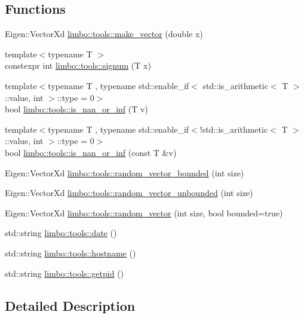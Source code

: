 \subsection*{Functions}
\begin{DoxyCompactItemize}
\item 
Eigen\+::\+Vector\+Xd \hyperlink{group__tools_ga029807776f0b7f44f806e4f9d92e34e7}{limbo\+::tools\+::make\+\_\+vector} (double x)
\item 
{\footnotesize template$<$typename T $>$ }\\constexpr int \hyperlink{group__tools_ga156cca8d927600da93054c952247857b}{limbo\+::tools\+::signum} (T x)
\item 
{\footnotesize template$<$typename T , typename std\+::enable\+\_\+if$<$ std\+::is\+\_\+arithmetic$<$ T $>$\+::value, int $>$\+::type  = 0$>$ }\\bool \hyperlink{group__tools_gabcb0caa2ffabd42fa865c9ab0b624681}{limbo\+::tools\+::is\+\_\+nan\+\_\+or\+\_\+inf} (T v)
\item 
{\footnotesize template$<$typename T , typename std\+::enable\+\_\+if$<$!std\+::is\+\_\+arithmetic$<$ T $>$\+::value, int $>$\+::type  = 0$>$ }\\bool \hyperlink{group__tools_gaf4ca69df04108670f0cc61e4a8ae7367}{limbo\+::tools\+::is\+\_\+nan\+\_\+or\+\_\+inf} (const T \&v)
\item 
Eigen\+::\+Vector\+Xd \hyperlink{group__tools_ga15dc04885b7309c7ca794db2429fb3f2}{limbo\+::tools\+::random\+\_\+vector\+\_\+bounded} (int size)
\item 
Eigen\+::\+Vector\+Xd \hyperlink{group__tools_ga0f1d777d8e14733853ffc5df7068246f}{limbo\+::tools\+::random\+\_\+vector\+\_\+unbounded} (int size)
\item 
Eigen\+::\+Vector\+Xd \hyperlink{group__tools_ga4db74517a1dead8a92f2f1482de106b8}{limbo\+::tools\+::random\+\_\+vector} (int size, bool bounded=true)
\item 
std\+::string \hyperlink{group__tools_gafb48d3271e7423f8b8d94599869bd9cb}{limbo\+::tools\+::date} ()
\item 
std\+::string \hyperlink{group__tools_ga4810ffa502d791d6ad750739a953f56f}{limbo\+::tools\+::hostname} ()
\item 
std\+::string \hyperlink{group__tools_ga4ee13d198367d07cabd37316e671db09}{limbo\+::tools\+::getpid} ()
\end{DoxyCompactItemize}


\subsection{Detailed Description}


